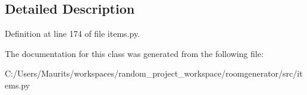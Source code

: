 \subsection{Detailed Description}


Definition at line 174 of file items.\+py.



The documentation for this class was generated from the following file\+:\begin{DoxyCompactItemize}
\item 
C\+:/\+Users/\+Maurits/workspaces/random\+\_\+project\+\_\+workspace/roomgenerator/src/items.\+py\end{DoxyCompactItemize}
